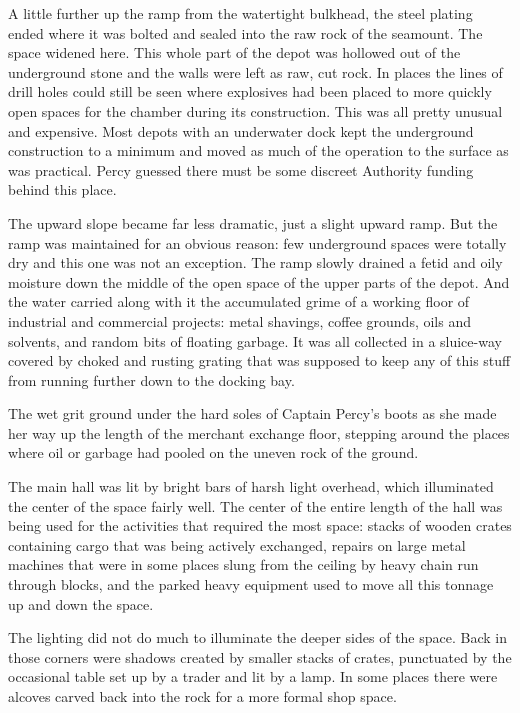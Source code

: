 \documentclass[]{scrbook}
\begin{document}
A little further up the ramp from the watertight bulkhead, the steel
plating ended where it was bolted and sealed into the raw rock of the
seamount. The space widened here. This whole part of the depot was
hollowed out of the underground stone and the walls were left as raw,
cut rock. In places the lines of drill holes could still be seen where
explosives had been placed to more quickly open spaces for the chamber
during its construction. This was all pretty unusual and expensive. Most
depots with an underwater dock kept the underground construction to a
minimum and moved as much of the operation to the surface as was
practical. Percy guessed there must be some discreet Authority funding
behind this place.

The upward slope became far less dramatic, just a slight upward ramp.
But the ramp was maintained for an obvious reason: few underground
spaces were totally dry and this one was not an exception. The ramp
slowly drained a fetid and oily moisture down the middle of the open
space of the upper parts of the depot. And the water carried along with
it the accumulated grime of a working floor of industrial and commercial
projects: metal shavings, coffee grounds, oils and solvents, and random
bits of floating garbage. It was all collected in a sluice-way covered
by choked and rusting grating that was supposed to keep any of this
stuff from running further down to the docking bay.

The wet grit ground under the hard soles of Captain Percy's boots as she
made her way up the length of the merchant exchange floor, stepping
around the places where oil or garbage had pooled on the uneven rock of
the ground.

The main hall was lit by bright bars of harsh light overhead, which
illuminated the center of the space fairly well. The center of the
entire length of the hall was being used for the activities that
required the most space: stacks of wooden crates containing cargo that
was being actively exchanged, repairs on large metal machines that were
in some places slung from the ceiling by heavy chain run through blocks,
and the parked heavy equipment used to move all this tonnage up and down
the space.

The lighting did not do much to illuminate the deeper sides of the
space. Back in those corners were shadows created by smaller stacks of
crates, punctuated by the occasional table set up by a trader and lit by
a lamp. In some places there were alcoves carved back into the rock for
a more formal shop space.
\end{document}

